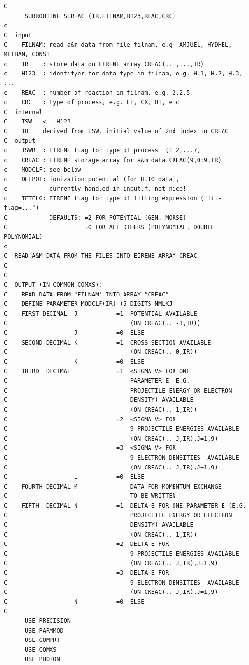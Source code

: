 \documentclass[12pt,dvips]{article}
\begin{document}
\begin{small}\begin{verbatim}
C
      SUBROUTINE SLREAC (IR,FILNAM,H123,REAC,CRC)
c
C  input
C    FILNAM: read a&m data from file filnam, e.g. AMJUEL, HYDHEL, METHAN, CONST
c    IR    : store data on EIRENE array CREAC(...,...,IR)
c    H123  : identifyer for data type in filnam, e.g. H.1, H.2, H.3, ...
c    REAC  : number of reaction in filnam, e.g. 2.2.5
c    CRC   : type of process, e.g. EI, CX, OT, etc
C  internal
C    ISW   <-- H123
C    IO    derived from ISW, initial value of 2nd index in CREAC
C  output
c    ISWR  : EIRENE flag for type of process  (1,2,...7)
c    CREAC : EIRENE storage array for a&m data CREAC(9,0:9,IR)
c    MODCLF: see below
c    DELPOT: ionization potential (for H.10 data),
c            currently handled in input.f. not nice!
c    IFTFLG: EIRENE flag for type of fitting expression ("fit-flag=...")
C            DEFAULTS: =2 FOR POTENTIAL (GEN. MORSE)
C                      =0 FOR ALL OTHERS (POLYNOMIAL, DOUBLE POLYNOMIAL)
c
C  READ A&M DATA FROM THE FILES INTO EIRENE ARRAY CREAC
C
C
C  OUTPUT (IN COMMON COMXS):
C    READ DATA FROM "FILNAM" INTO ARRAY "CREAC"
C    DEFINE PARAMETER MODCLF(IR) (5 DIGITS NMLKJ)
C    FIRST DECIMAL  J           =1  POTENTIAL AVAILABLE
C                                   (ON CREAC(..,-1,IR))
C                   J           =0  ELSE
C    SECOND DECIMAL K           =1  CROSS-SECTION AVAILABLE
C                                   (ON CREAC(..,0,IR))
C                   K           =0  ELSE
C    THIRD  DECIMAL L           =1  <SIGMA V> FOR ONE
C                                   PARAMETER E (E.G.
C                                   PROJECTILE ENERGY OR ELECTRON
C                                   DENSITY) AVAILABLE
C                                   (ON CREAC(..,1,IR))
C                               =2  <SIGMA V> FOR
C                                   9 PROJECTILE ENERGIES AVAILABLE
C                                   (ON CREAC(..,J,IR),J=1,9)
C                               =3  <SIGMA V> FOR
C                                   9 ELECTRON DENSITIES  AVAILABLE
C                                   (ON CREAC(..,J,IR),J=1,9)
C                   L           =0  ELSE
C    FOURTH DECIMAL M               DATA FOR MOMENTUM EXCHANGE
C                                   TO BE WRITTEN
C    FIFTH  DECIMAL N           =1  DELTA E FOR ONE PARAMETER E (E.G.
C                                   PROJECTILE ENERGY OR ELECTRON
C                                   DENSITY) AVAILABLE
C                                   (ON CREAC(..,1,IR))
C                               =2  DELTA E FOR
C                                   9 PROJECTILE ENERGIES AVAILABLE
C                                   (ON CREAC(..,J,IR),J=1,9)
C                               =3  DELTA E FOR
C                                   9 ELECTRON DENSITIES  AVAILABLE
C                                   (ON CREAC(..,J,IR),J=1,9)
C                   N           =0  ELSE
C
      USE PRECISION
      USE PARMMOD
      USE COMPRT
      USE COMXS
      USE PHOTON


\end{verbatim}
\end{small}
\end{document}
